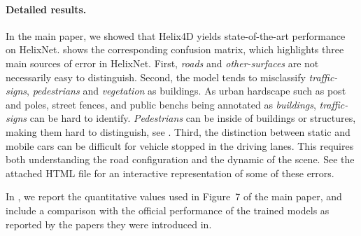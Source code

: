 \documentclass[runningheads]{tpls/llncs}
\begin{document}
\paragraph{Detailed results.} In the main paper, we showed that Helix4D yields state-of-the-art performance on HelixNet.  shows the corresponding confusion matrix, which highlights three main sources of error in HelixNet. First, \emph{roads} and \emph{other-surfaces} are not necessarily easy to distinguish. Second, the model tends to misclassify \emph{traffic-signs}, \emph{pedestrians} and \emph{vegetation} as buildings. As urban hardscape such as post and poles, street fences, and public benchs being annotated as \emph{buildings}, \emph{traffic-signs} can be hard to identify. \emph{Pedestrians} can be inside of buildings or structures, making them hard to distinguish, see . Third, the distinction between static and mobile cars can be difficult for vehicle stopped in the driving lanes. This requires both understanding the road configuration and the dynamic of the scene. See the attached HTML file for an interactive representation of some of these errors.

In , we report the quantitative values used in Figure~7 of the main paper, and include a comparison with the official performance of the trained models as reported by the papers they were introduced in.
\end{document}
